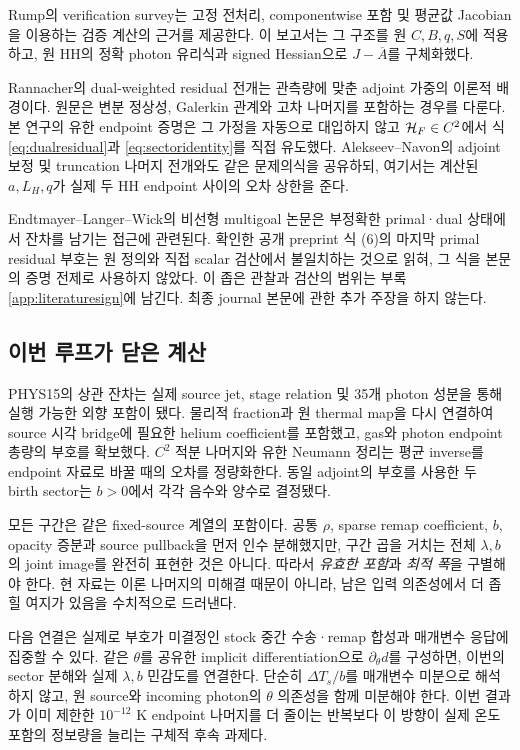 Rump의 verification survey는 고정 전처리, componentwise 포함 및 평균값 Jacobian을 이용하는 검증 계산의 근거를 제공한다. 이 보고서는 그 구조를 원 $C,B,q,S$에 적용하고, 원 HH의 정확 photon 유리식과 signed Hessian으로 $J-\overline A$를 구체화했다.\cite{Rump2010}

Rannacher의 dual-weighted residual 전개는 관측량에 맞춘 adjoint 가중의 이론적 배경이다. 원문은 변분 정상성, Galerkin 관계와 고차 나머지를 포함하는 경우를 다룬다. 본 연구의 유한 endpoint 증명은 그 가정을 자동으로 대입하지 않고 $\mathcal H_F\in C^2$에서 식 \eqref{eq:dualresidual}과 \eqref{eq:sectoridentity}를 직접 유도했다.\cite{Rannacher2003} Alekseev--Navon의 adjoint 보정 및 truncation 나머지 전개와도 같은 문제의식을 공유하되, 여기서는 계산된 $a,L_H,q$가 실제 두 HH endpoint 사이의 오차 상한을 준다.\cite{Alekseev2005}

Endtmayer--Langer--Wick의 비선형 multigoal 논문은 부정확한 primal·dual 상태에서 잔차를 남기는 접근에 관련된다. 확인한 공개 preprint 식 (6)의 마지막 primal residual 부호는 원 정의와 직접 scalar 검산에서 불일치하는 것으로 읽혀, 그 식을 본문의 증명 전제로 사용하지 않았다. 이 좁은 관찰과 검산의 범위는 부록 \ref{app:literaturesign}에 남긴다. 최종 journal 본문에 관한 추가 주장을 하지 않는다.\cite{Endtmayer2019}

\subsection{이번 루프가 닫은 계산}
PHYS15의 상관 잔차는 실제 source jet, stage relation 및 35개 photon 성분을 통해 실행 가능한 외향 포함이 됐다. 물리적 fraction과 원 thermal map을 다시 연결하여 source 시각 bridge에 필요한 helium coefficient를 포함했고, gas와 photon endpoint 총량의 부호를 확보했다. $C^2$ 적분 나머지와 유한 Neumann 정리는 평균 inverse를 endpoint 자료로 바꿀 때의 오차를 정량화한다. 동일 adjoint의 부호를 사용한 두 birth sector는 $b>0$에서 각각 음수와 양수로 결정됐다.

모든 구간은 같은 fixed-source 계열의 포함이다. 공통 $\rho$, sparse remap coefficient, $b$, opacity 증분과 source pullback을 먼저 인수 분해했지만, 구간 곱을 거치는 전체 $\lambda,b$의 joint image를 완전히 표현한 것은 아니다. 따라서 \emph{유효한 포함}과 \emph{최적 폭}을 구별해야 한다. 현 자료는 이론 나머지의 미해결 때문이 아니라, 남은 입력 의존성에서 더 좁힐 여지가 있음을 수치적으로 드러낸다.

다음 연결은 실제로 부호가 미결정인 stock 중간 수송·remap 합성과 매개변수 응답에 집중할 수 있다. 같은 $\theta$를 공유한 implicit differentiation으로 $\partial_\theta d$를 구성하면, 이번의 sector 분해와 실제 $\lambda,b$ 민감도를 연결한다. 단순히 $\Delta T_s/b$를 매개변수 미분으로 해석하지 않고, 원 source와 incoming photon의 $\theta$ 의존성을 함께 미분해야 한다. 이번 결과가 이미 제한한 $10^{-12}$ K endpoint 나머지를 더 줄이는 반복보다 이 방향이 실제 온도 포함의 정보량을 늘리는 구체적 후속 과제다.

